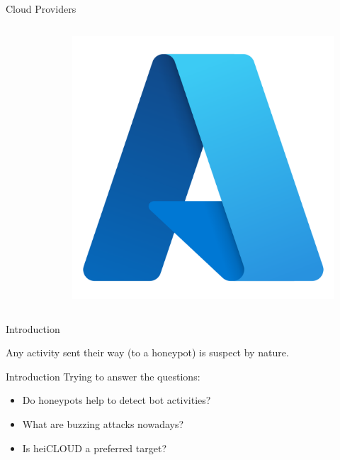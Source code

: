 \begin{frame}{Cloud Providers}
\begin{columns}
\begin{column}{0.25\textwidth}
\begin{figure}
            \end{figure}
        \end{column}
        \begin{column}{0.25\textwidth}
            \begin{figure}
                \centering
                \includegraphics[width=0.5\columnwidth]{img/azure_logo.png}
            \end{figure}
        \end{column}
    \end{columns}
\end{frame}

\begin{frame}{Introduction}
    \begin{block}{\citet{Spitzner2003}}
        Any activity sent their way (to a honeypot) is suspect by nature.
    \end{block}
\end{frame}

\begin{frame}{Introduction}
    Trying to answer the questions:
    \begin{itemize}
        \item Do honeypots help to detect bot activities?
        \item What are buzzing attacks nowadays?
        \item Is heiCLOUD a preferred target?
    \end{itemize}
\end{frame}

